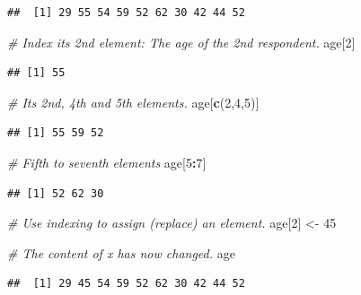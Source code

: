\documentclass[
]{book}
\newenvironment{Shaded}{\begin{snugshade}}{\end{snugshade}}
\newcommand{\CommentTok}[1]{\textcolor[rgb]{0.56,0.35,0.01}{\textit{#1}}}
\newcommand{\DecValTok}[1]{\textcolor[rgb]{0.00,0.00,0.81}{#1}}
\newcommand{\FunctionTok}[1]{\textcolor[rgb]{0.13,0.29,0.53}{\textbf{#1}}}
\newcommand{\NormalTok}[1]{#1}
\newcommand{\OtherTok}[1]{\textcolor[rgb]{0.56,0.35,0.01}{#1}}
\newcommand{\SpecialCharTok}[1]{\textcolor[rgb]{0.81,0.36,0.00}{\textbf{#1}}}
\begin{document}
\begin{verbatim}
##  [1] 29 55 54 59 52 62 30 42 44 52
\end{verbatim}

\begin{Shaded}
\begin{Highlighting}[]
\CommentTok{\# Index its 2nd element: The age of the 2nd respondent.}
\NormalTok{age[}\DecValTok{2}\NormalTok{]}
\end{Highlighting}
\end{Shaded}

\begin{verbatim}
## [1] 55
\end{verbatim}

\begin{Shaded}
\begin{Highlighting}[]
\CommentTok{\# Its 2nd, 4th and 5th elements.}
\NormalTok{age[}\FunctionTok{c}\NormalTok{(}\DecValTok{2}\NormalTok{,}\DecValTok{4}\NormalTok{,}\DecValTok{5}\NormalTok{)]}
\end{Highlighting}
\end{Shaded}

\begin{verbatim}
## [1] 55 59 52
\end{verbatim}

\begin{Shaded}
\begin{Highlighting}[]
\CommentTok{\# Fifth to seventh elements}
\NormalTok{age[}\DecValTok{5}\SpecialCharTok{:}\DecValTok{7}\NormalTok{]}
\end{Highlighting}
\end{Shaded}

\begin{verbatim}
## [1] 52 62 30
\end{verbatim}

\begin{Shaded}
\begin{Highlighting}[]
\CommentTok{\# Use indexing to assign (replace) an element.}
\NormalTok{age[}\DecValTok{2}\NormalTok{] }\OtherTok{\textless{}{-}} \DecValTok{45}

\CommentTok{\# The content of x has now changed.}
\NormalTok{age}
\end{Highlighting}
\end{Shaded}

\begin{verbatim}
##  [1] 29 45 54 59 52 62 30 42 44 52
\end{verbatim}
\end{document}
